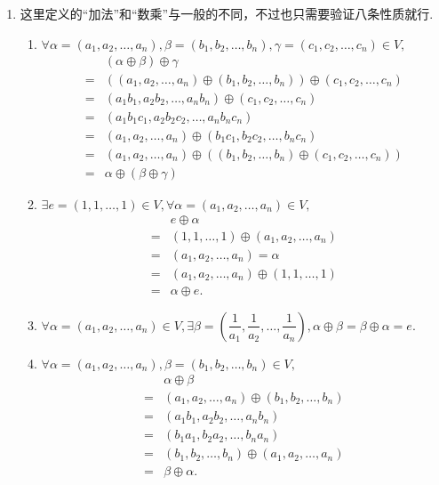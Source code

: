 \begin{solution}
\begin{enumerate}
                \item 这里定义的“加法”和“数乘”与一般的不同，不过也只需要验证八条性质就行.
                \begin{enumerate}
                    \item $\forall \alpha = (a_1, a_2, \ldots, a_n), \beta = (b_1, b_2, \ldots, b_n), \gamma = (c_1, c_2, \ldots, c_n) \in V, $
                    \begin{align*}
                        & (\alpha \oplus \beta) \oplus \gamma \\ ={} & ((a_1, a_2, \ldots, a_n)\oplus (b_1, b_2, \ldots, b_n)) \oplus (c_1, c_2, \ldots, c_n) \\ ={} & (a_1b_1, a_2b_2, \ldots, a_nb_n) \oplus (c_1, c_2, \ldots, c_n) \\ ={} & (a_1b_1c_1, a_2b_2c_2, \ldots, a_nb_nc_n) \\ ={} & (a_1, a_2, \ldots, a_n)\oplus (b_1c_1, b_2c_2, \ldots, b_nc_n) \\ ={} & (a_1, a_2, \ldots, a_n) \oplus ((b_1, b_2, \ldots, b_n) \oplus (c_1, c_2, \ldots, c_n)) \\ ={} & \alpha \oplus (\beta \oplus \gamma)
                    \end{align*}

                    \item $\exists e = (1, 1, \ldots , 1) \in V, \forall \alpha = (a_1, a_2, \ldots, a_n) \in V,$
                    \begin{align*}
                        & e \oplus \alpha \\ ={} & (1, 1, \ldots , 1) \oplus (a_1, a_2, \ldots, a_n) \\ ={} & (a_1, a_2, \ldots, a_n) = \alpha \\ ={} & (a_1, a_2, \ldots, a_n) \oplus (1, 1, \ldots , 1) \\ ={} & \alpha \oplus e.
                    \end{align*}

                    \item $\forall \alpha = (a_1, a_2, \ldots, a_n) \in V, \exists \beta = (\dfrac{1}{a_1}, \dfrac{1}{a_2}, \ldots, \dfrac{1}{a_n}), \alpha \oplus \beta = \beta \oplus \alpha = e.$

                    \item $\forall \alpha = (a_1, a_2, \ldots, a_n), \beta = (b_1, b_2, \ldots, b_n) \in V,$
                    \begin{align*}
                        & \alpha \oplus \beta \\ ={} & (a_1, a_2, \ldots, a_n) \oplus (b_1, b_2, \ldots, b_n) \\ ={} & (a_1b_1, a_2b_2, \ldots, a_nb_n) \\ ={} & (b_1a_1, b_2a_2, \ldots, b_na_n) \\ ={} & (b_1, b_2, \ldots, b_n) \oplus (a_1, a_2, \ldots, a_n) \\ ={} & \beta \oplus \alpha.
                    \end{align*}


\end{enumerate}
\end{enumerate}
\end{solution}
